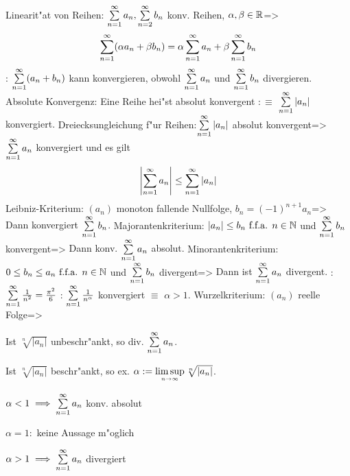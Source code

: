 \theorem Linearit"at von Reihen:
  $\sumn 1 a_n,\sumn 2 b_n$ konv. Reihen, $\alpha,\beta \in\mathbb R$=>{
  \[\sumn 1 (\alpha a_n+\beta b_n) = \alpha \sumn 1 a_n + \beta \sumn 1 b_n
    \]
  }
\remark:{
  $\sumn 1 (a_n+b_n)$ kann konvergieren, obwohl $\sumn 1 a_n$ und
  $\sumn 1 b_n$ divergieren.
  }
 Absolute Konvergenz:{
  Eine Reihe hei"st absolut konvergent $:\equiv$
  $\sumn 1 |a_n|$ konvergiert.
  }
\theorem Dreiecksungleichung f"ur Reihen:$\sumn 1 |a_n|$ absolut konvergent=>{
  $\sumn 1 a_n$ konvergiert und es gilt
  \[
    \left|\sumn 1 a_n\right| \le \sumn 1 |a_n|
  \]
}
\theorem Leibniz-Kriterium:
  $(a_n)$ monoton fallende Nullfolge, $b_n=(-1)^{n+1}a_n$=>{
  Dann konvergiert $\sumn 1 b_n$.
  }
\theorem Majorantenkriterium:
  $|a_n|\le b_n \text{ f.f.a. } n\in\mathbb N$ und $\sumn 1 b_n$ konvergent=>{
  Dann konv. $\sumn 1 a_n$ absolut.
  }
\lessertheorem Minorantenkriterium:
  $0\le b_n\le a_n \text{ f.f.a. } n\in\mathbb N$ und $\sumn 1 b_n$ divergent=>{
  Dann ist $\sumn 1 a_n$ divergent.
  }
\example:{
  $\sumn 1 \frac 1 {n^2}=\frac {\pi^2} 6$
  }
\remark:{
  $\sumn 1 \frac 1 {n^\alpha}$ konvergiert $\equiv$ $\alpha>1$.
  }
\theorem Wurzelkriterium:
  $(a_n)$ reelle Folge=>{
  \begin{stmts}
    \item Ist $\sqrt[n]{|a_n|}$ unbeschr"ankt, so div. $\sumn 1 a_n$.
    \item Ist $\sqrt[n]{|a_n|}$ beschr"ankt, so ex.
          $\alpha:=\limsupn \sqrt[n]{|a_n|}$.
    \item $\alpha<1 \implies \sumn 1 a_n$ konv. absolut
    \item $\alpha=1:$ keine Aussage m"oglich
    \item $\alpha>1 \implies \sumn 1 a_n$ divergiert
    \end{stmts}
  }
